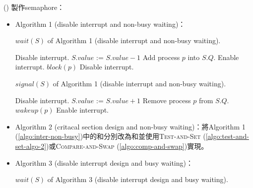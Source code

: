 \begin{theorem}{()} 製作semaphore：\begin{itemize}
        \item Algorithm 1 (disable interrupt and non-busy waiting)：\label{algo:inter-non-busy}
        \begin{algorithm}[H]
            \caption{$wait(S)$ of Algorithm 1 (disable interrupt and non-busy waiting).}
            \begin{algorithmic}[1]
                    \State Disable interrupt.
                    \State $S.value$ := $S.value - 1$
                        \State Add process $p$ into $S.Q$.
                        \State Enable interrupt.
                        \State $block(p)$ 
                    \Else 
                        \State Disable interrupt.
                    \EndIf
                \EndFunction
            \end{algorithmic}
        \end{algorithm}
        \begin{algorithm}[H]
            \caption{$signal(S)$ of Algorithm 1 (disable interrupt and non-busy waiting).}
            \begin{algorithmic}[1]
                    \State Disable interrupt.
                    \State $S.value$ := $S.value + 1$
                        \State Remove process $p$ from $S.Q$.
                        \State $wakeup(p)$ 
                    \EndIf
                    \State Enable interrupt.
                \EndFunction
            \end{algorithmic}
        \end{algorithm}
        \item Algorithm 2 (critacal section design and non-busy waiting)：\label{algo:cs-non-busy}將Algorithm 1 (\ref{algo:inter-non-busy})中的和分別改為和並使用\textsc{Test-and-Set} (\ref{algo:test-and-set-algo-2})或\textsc{Compare-and-Swap} (\ref{algo:comp-and-swap})實現。
        \item Algorithm 3 (disable interrupt design and busy waiting)：\label{algo:inter-busy}
        \begin{algorithm}[H]
            \caption{$wait(S)$ of Algorithm 3 (disable interrupt design and busy waiting).}

\end{algorithm}
\end{itemize}
\end{theorem}

